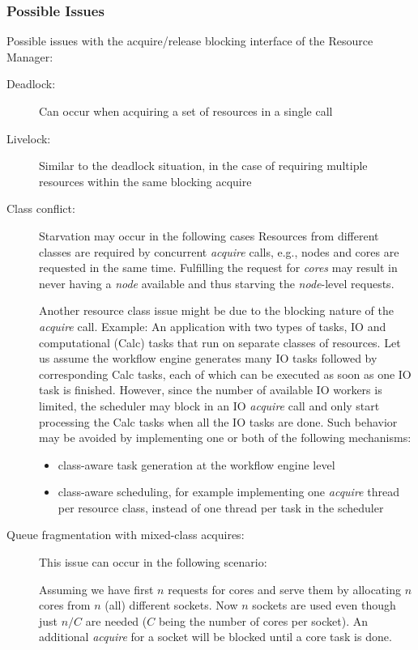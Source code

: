 \documentclass[10pt]{article}
\begin{document}
\subsubsection{Possible Issues}
Possible issues with the acquire/release blocking interface of the Resource
Manager:
\begin{description}
    \item [Deadlock:] Can occur when acquiring a set of resources in a single
    call 
    \item [Livelock:] Similar to the deadlock situation, in the case of requiring
    multiple resources within the same blocking acquire
    \item [Class conflict:] Starvation may occur in the following cases
    Resources from different classes are required by concurrent
    \emph{acquire} calls, e.g., nodes and cores are requested in the same time.
    Fulfilling the request for \emph{cores} may result in never having a \emph{node}
    available and thus starving the \emph{node}-level requests.
    
    Another resource class issue might be due to the blocking nature of the
    \emph{acquire} call. 
    Example:
    An application with two types of tasks, IO and computational (Calc)
    tasks that run on separate classes of resources. Let us assume the workflow
    engine generates many IO tasks followed by corresponding Calc tasks, each of
    which can be executed as soon as one IO task is finished.
    However, since the number of available IO workers is limited, the
    scheduler may block in an IO \emph{acquire} call and only start processing the
    Calc tasks when all the IO tasks are done.
    Such behavior may be avoided by implementing one or both of the following 
    mechanisms:
    \begin{itemize}
        \item class-aware task generation at the workflow engine level
        \item class-aware scheduling, for example implementing one \emph{acquire} 
        thread per resource class, instead of one thread per task in the scheduler
    \end{itemize}
    
     \item [Queue fragmentation with mixed-class acquires:]
     This issue can occur in the following scenario: 
     
     Assuming we have first $n$ requests for cores and serve them by allocating 
     $n$ cores from $n$ (all) different sockets. Now $n$ sockets are used even 
     though just $n/C$ are needed ($C$ being the number of cores per socket).     
     An additional \emph{acquire} for a socket will be blocked until a core task 
     is done.
     

\end{description}
\end{document}
